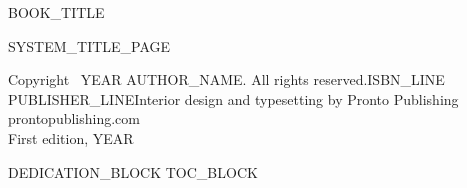 \documentclass[12pt,openany]{book}
\begin{document}
\frontmatter
\pagestyle{plain}

\thispagestyle{empty}
\vspace*{0.28\textheight}
\begin{center}
{\Large {{BOOK_TITLE}}}
\end{center}
\clearpage
\thispagestyle{empty}\null\clearpage

{{SYSTEM_TITLE_PAGE}}

\thispagestyle{empty}
\vspace*{\fill}
\begin{flushleft}
\small
Copyright \textcopyright\ {{YEAR}} {{AUTHOR_NAME}}. All rights reserved.{{ISBN_LINE}}\\[1em]
{{PUBLISHER_LINE}}Interior design and typesetting by Pronto Publishing\\
prontopublishing.com\\[1em]
First edition, {{YEAR}}
\end{flushleft}
\clearpage

{{DEDICATION_BLOCK}}
{{TOC_BLOCK}}

\clearpage
\ifodd\value{page}\else\thispagestyle{empty}\null\clearpage\fi

\mainmatter
\pagestyle{prontobody}
\markboth{}{}
\end{document}
